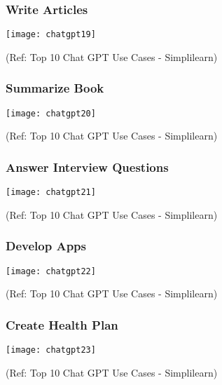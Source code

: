 \begin{frame}[fragile]\frametitle{Write Articles}
\begin{center}
\texttt{[image: chatgpt19]}
\end{center}

{\tiny (Ref: Top 10 Chat GPT Use Cases - Simplilearn)}
\end{frame}

\begin{frame}[fragile]\frametitle{Summarize Book}
\begin{center}
\texttt{[image: chatgpt20]}
\end{center}

{\tiny (Ref: Top 10 Chat GPT Use Cases - Simplilearn)}
\end{frame}

\begin{frame}[fragile]\frametitle{Answer Interview Questions}
\begin{center}
\texttt{[image: chatgpt21]}
\end{center}

{\tiny (Ref: Top 10 Chat GPT Use Cases - Simplilearn)}
\end{frame}

\begin{frame}[fragile]\frametitle{Develop Apps}
\begin{center}
\texttt{[image: chatgpt22]}
\end{center}

{\tiny (Ref: Top 10 Chat GPT Use Cases - Simplilearn)}
\end{frame}

\begin{frame}[fragile]\frametitle{Create Health Plan}
\begin{center}
\texttt{[image: chatgpt23]}
\end{center}

{\tiny (Ref: Top 10 Chat GPT Use Cases - Simplilearn)}
\end{frame}

